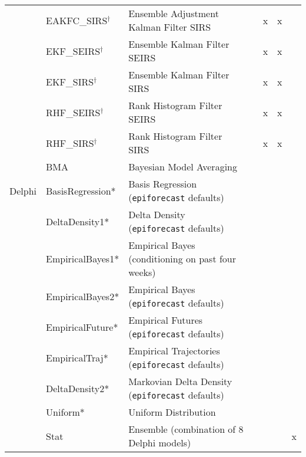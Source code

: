 \begin{table*}
\begin{tabular}{p{1.6cm} l p{7.5cm} l  p{1cm}  p{1cm} p{1cm}}
~        & EAKFC\_SIRS$^\dagger$        & Ensemble Adjustment Kalman Filter SIRS & \cite{Pei2017}  & x & x & \\
~        & EKF\_SEIRS$^\dagger$         & Ensemble Kalman Filter SEIRS & \cite{Yang2014}    & x             & x &                    \\
~        & EKF\_SIRS$^\dagger$          & Ensemble Kalman Filter SIRS & \cite{Yang2014}     & x             & x   &                 \\
~        & RHF\_SEIRS$^\dagger$         & Rank Histogram Filter SEIRS & \cite{Yang2014}    & x             & x     &               \\
~        & RHF\_SIRS$^\dagger$          & Rank Histogram Filter SIRS & \cite{Yang2014}     & x             & x       &             \\
~        & BMA                & Bayesian Model Averaging & \cite{Yamana2017}      & ~             & ~          &          \\
\hline
Delphi   & BasisRegression*    & Basis Regression ({\tt epiforecast} defaults) & \cite{Brooks2015a} & ~             & ~     &               \\ 
~        & DeltaDensity1*      & Delta Density ({\tt epiforecast} defaults)   & \cite{Brooks2018} & ~             & ~       &             \\ 
~        & EmpiricalBayes1*    & Empirical Bayes (conditioning on past four weeks) & \cite{Brooks2015,Brooks2015a} & ~             & ~  &                  \\ 
~        & EmpiricalBayes2*    & Empirical Bayes ({\tt epiforecast} defaults) & \cite{Brooks2015,Brooks2015a} & ~             & ~            &        \\ 
~        & EmpiricalFuture*    & Empirical Futures ({\tt epiforecast} defaults) &  \cite{Brooks2015a} & ~             & ~         &           \\ 
~        & EmpiricalTraj*      & Empirical Trajectories ({\tt epiforecast} defaults)& \cite{Brooks2015a} & ~             & ~         &           \\ 
~        & DeltaDensity2*      & Markovian Delta Density ({\tt epiforecast} defaults)& \cite{Brooks2018} & ~             & ~          &          \\ 
~        & Uniform*            & Uniform Distribution&  & ~             & ~   &                 \\ 
~        & Stat               & Ensemble (combination of 8 Delphi models)& \cite{Brooks2018} & ~             & ~  & x                 \\

\end{tabular}
\end{table*}
